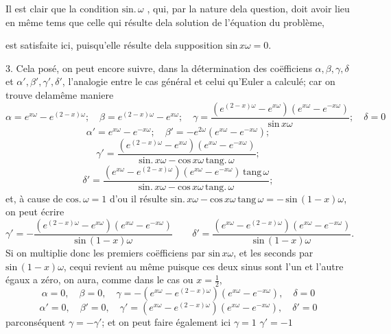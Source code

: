 \documentclass[11pt,a4paper]{article}
\begin{document}
Il est clair que la condition $\text{sin.}\,\omega$ , qui, par la nature dela question, doit avoir lieu
en même tems que celle qui résulte dela solution de l'équation du problème,


est satisfaite ici, puisqu'elle résulte dela supposition $\text{sin}\,x\omega = 0$.

3. Cela posé, on peut encore suivre, dans la détermination des coëfficiens
$\alpha, \beta, \gamma, \delta$ et $\alpha', \beta', \gamma', \delta'$, l'analogie entre le cas général et celui qu'Euler a calculé;
car on trouve delamême maniere
\[ \alpha = e^{x\omega} - e^{(2-x)\omega};\quad \beta = e^{(2-x)\omega} - e^{x\omega};\quad \gamma = \frac{(e^{(2-x)\omega} - e^{x\omega})(e^{x\omega} - e^{-x\omega})}{\text{sin}\,x\omega};\quad \delta = 0 \]
\[ \alpha' = e^{x\omega} - e^{-x\omega};\quad \beta' = -e^{2\omega}(e^{x\omega} - e^{-x\omega}); \]
\[ \gamma' = \frac{(e^{(2-x)\omega} - e^{x\omega})(e^{x\omega} - e^{-x\omega})}{\text{sin.}\,x\omega - \text{cos}\,x\omega\,\text{tang.}\,\omega}; \]
\[ \delta' = \frac{(e^{x\omega} - e^{(2-x)\omega})(e^{x\omega} - e^{-x\omega})\,\text{tang}\,\omega}{\text{sin.}\,x\omega - \text{cos}\,x\omega\,\text{tang.}\,\omega}; \]
et, à cause de $\text{cos.}\,\omega = 1$ d'ou il résulte $\text{sin.}\,x\omega - \text{cos}\,x\omega\,\text{tang}\,\omega = -\,\text{sin}\,(1-x)\omega$, on peut écrire
\[ \gamma' = -\frac{(e^{(2-x)\omega} - e^{x\omega})(e^{x\omega} - e^{-x\omega})}{\text{sin}\,(1-x)\omega}\qquad \delta' = \frac{(e^{x\omega} - e^{(2-x)\omega})(e^{x\omega} - e^{-x\omega})}{\text{sin}\,(1-x)\omega}. \]
Si on multiplie donc les premiers coëfficiens par $\text{sin}\,x\omega$, et les seconds par $\text{sin}\,(1-x)\omega$,
cequi revient au même puisque ces deux sinus sont l'un et l'autre égaux
a zéro, on aura, comme dans le cas ou $x = \frac{1}{2}$,
\[ \alpha = 0,\quad \beta = 0,\quad \gamma = -(e^{x\omega} - e^{(2-x)\omega})(e^{x\omega} - e^{-x\omega}),\quad \delta = 0 \]
\[ \alpha' = 0,\quad \beta' = 0,\quad \gamma' = (e^{x\omega} - e^{(2-x)\omega})(e^{x\omega} - e^{-x\omega}),\quad \delta' = 0 \]
parconséquent $\gamma = -\gamma'$; et on peut faire également ici $\gamma = 1$ $\gamma' = -1$
\end{document}
